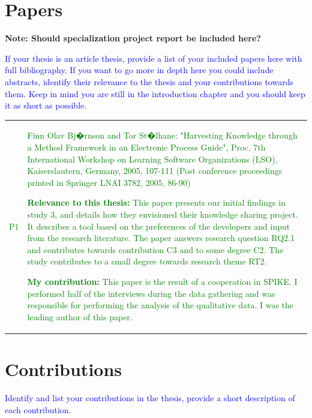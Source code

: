 \section{Papers}

\textbf{Note: Should specialization project report be included here?}

\textcolor{blue}{If your thesis is an article thesis, provide a list of your included papers here with full 
bibliography. If you want to go more in depth here you could include abstracts, identify their relevance to the thesis 
and your contributions towards them. Keep in mind you are still in the introduction chapter and you should keep it as 
short as possible.}


\begin{table}[!h]
\begin{tabular}{lp{}} 

\textcolor{green}{P1} &

\textcolor{green}{Finn Olav Bj�rnson and Tor St�lhane: "Harvesting Knowledge through a Method Framework in an Electronic 
Process Guide", Proc. 7th International Workshop on Learning Software Organizations (LSO), Kaiserslautern, Germany, 
2005, 107-111 (Post conference proceedings printed in Springer LNAI 3782, 2005, 86-90)}

\textcolor{green}{\textbf{Relevance to this thesis:} This paper presents our initial findings in study 3, and details 
how they envisioned their knowledge sharing project. It describes a tool based on the preferences of the developers and 
input from the research literature. The paper answers research question RQ2.1 and contributes towards contribution C3 
and to some degree C2. The study contributes to a small degree towards research theme RT2.}

\textcolor{green}{\textbf{My contribution:} This paper is the result of a cooperation in SPIKE. I performed half of the 
interviews during the data gathering and was responsible for performing the analysis of the qualitative data. I was the 
leading author of this paper.} \\

\end{tabular}
\end{table}

	

\section{Contributions}
\label{sec:contribution}
\textcolor{blue}{Identify and list your contributions in the thesis, provide a short description of each contribution.}

